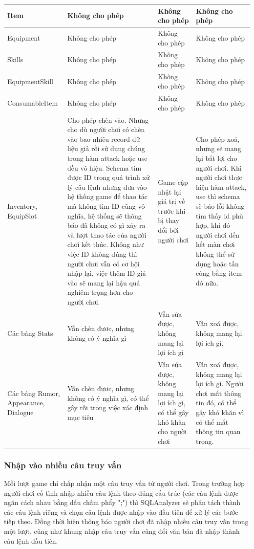 \begin{longtable}{|p{3cm}|p{3cm}|p{3cm}|p{3cm}|}
	\hline 
	Item & Không cho phép & Không cho phép & Không cho phép\\
	\hline
	Equipment & Không cho phép & Không cho phép & Không cho phép\\
	\hline
	Skills & Không cho phép & Không cho phép & Không cho phép\\
	\hline
	EquipmentSkill & Không cho phép & Không cho phép & Không cho phép\\
	\hline
	ConsumableItem & Không cho phép & Không cho phép & Không cho phép\\
	\hline
	Inventory, EquipSlot & Cho phép chèn vào. Nhưng cho dù người chơi có chèn vào bao nhiêu record dữ liệu giả rồi sử dụng chúng trong hàm attack hoặc use đều vô hiệu. Schema tìm được ID trong quá trình xử lý câu lệnh nhưng đưa vào hệ thống game để thao tác mà không tìm ID cũng vô nghĩa, hệ thống sẽ thông báo đã không có gì xảy ra và lượt thao tác của người chơi kết thúc. Không như việc ID không đúng thì người chơi vẫn có cơ hội nhập lại, việc thêm ID giả vào sẽ mang lại hậu quả nghiêm trọng hơn cho người chơi. & Game cập nhật lại giá trị về trước khi bị thay đổi bởi người chơi & Cho phép xoá, nhưng sẽ mang lại bất lợi cho người chơi. Khi người chơi thực hiện hàm attack, use thì schema sẽ báo lỗi không tìm thấy id phù hợp, khi đó người chơi đến hết màn chơi không thể sử dụng hoặc tấn công bằng item đó nữa.\\
	\hline
	Các bảng Stats & Vẫn chèn đươc, nhưng không có ý nghĩa gì & Vẫn sửa được, không mang lại lợi ích gì & Vẫn xoá được, không mang lại lợi ích gì. \\
	\hline
	Các bảng Rumor, Appearance, Dialogue & Vẫn chèn đươc, nhưng không có ý nghĩa gì, có thể gây rối trong việc xác định mục tiêu & Vẫn sửa được, không mang lại lợi ích gì, có thể gây khó khăn cho người chơi & Vẫn xoá được, không mang lại lợi ích gì. Người chơi mất thông tin đó, có thể gây khó khăn vì có thể mất thông tin quan trọng.\\
	\hline
	
\end{longtable}
\subsubsection{Nhập vào nhiều câu truy vấn}
\hspace*{0.5cm} Mỗi lượt game chỉ chấp nhận một câu truy vấn từ người chơi. Trong trường hợp người chơi cố tình nhập nhiều câu lệnh theo đúng cấu trúc (các câu lệnh được ngăn cách nhau bằng dấu chấm phẩy ";") thì SQLAnalyzer sẽ phân tách thành các câu lệnh riêng và chọn câu lệnh được nhập vào đầu tiên để xử lý các bước tiếp theo. Đồng thời hiện thông báo người chơi đã nhập nhiều câu truy vấn trong một lượt, cũng như khung nhập câu truy vấn cũng đổi văn bản đã nhập thành câu lệnh đầu tiên.
